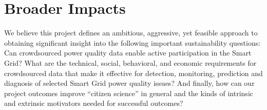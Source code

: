 
\section{Broader Impacts}
\label{sec:merit}




We believe this project defines an ambitious, aggressive, yet feasible approach to obtaining significant insight into the following important sustainability questions: Can crowdsourced power quality data enable active participation in the Smart Grid?  What are the technical, social, behavioral, and economic requirements for crowdsourced data that make it effective for detection, monitoring, prediction and diagnosis of selected Smart Grid power quality issues? And finally, how can our project outcomes improve ``citizen science'' in general and the kinds of intrinsic and extrinsic motivators needed for successful outcomes?

